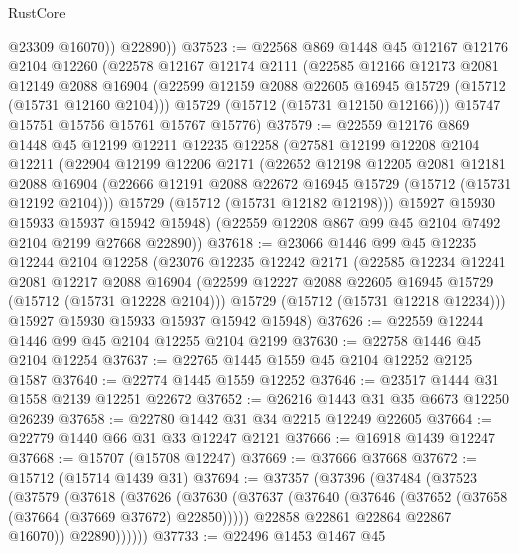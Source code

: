 \begin{lexlean}{RustCore}
\begin{coremodule}
            @23309
            @16070))
        @22890))
@37523 := @22568
    @869
    @1448
    @45
    @12167
    @12176
    @2104
    @12260
    (@22578
      @12167
      @12174
      @2111
      (@22585
        @12166
        @12173
        @2081
        @12149
        @2088
        @16904
        (@22599 @12159 @2088 @22605 @16945 @15729 (@15712 (@15731 @12160 @2104)))
        @15729
        (@15712 (@15731 @12150 @12166)))
      @15747
      @15751
      @15756
      @15761
      @15767
      @15776)
@37579 := @22559
    @12176
    @869
    @1448
    @45
    @12199
    @12211
    @12235
    @12258
    (@27581
      @12199
      @12208
      @2104
      @12211
      (@22904
        @12199
        @12206
        @2171
        (@22652
          @12198
          @12205
          @2081
          @12181
          @2088
          @16904
          (@22666 @12191 @2088 @22672 @16945 @15729 (@15712 (@15731 @12192 @2104)))
          @15729
          (@15712 (@15731 @12182 @12198)))
        @15927
        @15930
        @15933
        @15937
        @15942
        @15948)
      (@22559 @12208 @867 @99 @45 @2104 @7492 @2104 @2199 @27668 @22890))
@37618 := @23066
    @1446
    @99
    @45
    @12235
    @12244
    @2104
    @12258
    (@23076
      @12235
      @12242
      @2171
      (@22585
        @12234
        @12241
        @2081
        @12217
        @2088
        @16904
        (@22599 @12227 @2088 @22605 @16945 @15729 (@15712 (@15731 @12228 @2104)))
        @15729
        (@15712 (@15731 @12218 @12234)))
      @15927
      @15930
      @15933
      @15937
      @15942
      @15948)
@37626 := @22559 @12244 @1446 @99 @45 @2104 @12255 @2104 @2199
@37630 := @22758 @1446 @45 @2104 @12254
@37637 := @22765 @1445 @1559 @45 @2104 @12252 @2125 @1587
@37640 := @22774 @1445 @1559 @12252
@37646 := @23517 @1444 @31 @1558 @2139 @12251 @22672
@37652 := @26216 @1443 @31 @35 @6673 @12250 @26239
@37658 := @22780 @1442 @31 @34 @2215 @12249 @22605
@37664 := @22779 @1440 @66 @31 @33 @12247 @2121
@37666 := @16918 @1439 @12247
@37668 := @15707 (@15708 @12247)
@37669 := @37666 @37668
@37672 := @15712 (@15714 @1439 @31)
@37694 := @37357
    (@37396
      (@37484
        (@37523
          (@37579
            (@37618
              (@37626
                (@37630
                  (@37637
                    (@37640 (@37646 (@37652 (@37658 (@37664 (@37669 @37672) @22850)))))
                    @22858
                    @22861
                    @22864
                    @22867
                    @16070))
                @22890))))))
@37733 := @22496
    @1453
    @1467
    @45

\end{coremodule}
\end{lexlean}

